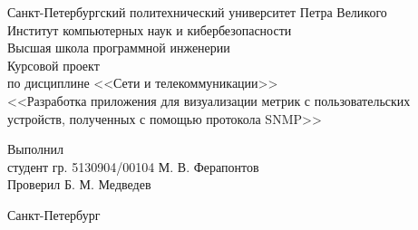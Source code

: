 \begin{titlepage}

	\begin{center}
	  Санкт-Петербургский политехнический университет Петра Великого\\
	  Институт компьютерных наук и кибербезопасности\\
	  Высшая школа программной инженерии\\[8cm]

	  {\LARGE Курсовой проект}\\[0.5cm]
	  \noindent по дисциплине <<Сети и телекоммуникации>>\\
	  \noindent <<Разработка приложения для визуализации метрик с пользовательских устройств, полученных с помощью протокола SNMP>>
	  \\[5cm]
	\end{center}

	  \noindent Выполнил\\
	  \noindent студент гр. 5130904/00104 \hfill М. В. Ферапонтов\\

	  \noindent Проверил \hfill Б. М. Медведев

	\vfill

	\begin{center}
	  Санкт-Петербург\\
	  \the\year
	\end{center}

\end{titlepage}
